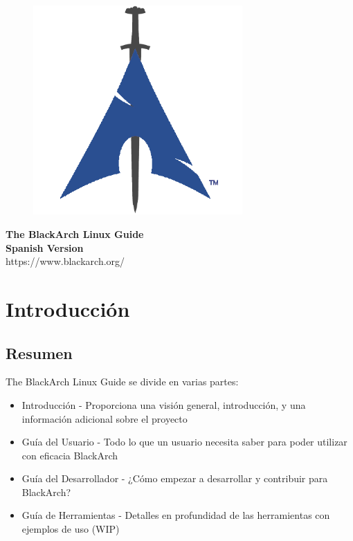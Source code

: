 \documentclass[a4paper, oneside, 11pt]{book}
\begin{document}
\pagestyle{empty}
\begin{center}
\begin{figure}[htbp]
\centering
\vspace{0.5cm}
\includegraphics[width=8cm]{images/logo.png}
\label{fig:logo}
\end{figure}
\vspace{0.5cm}
\Huge{\textbf{The BlackArch Linux Guide}}\\
\vspace{0.5cm}
\Large{\textbf{Spanish Version}}\\
\vspace{1cm}
\Large{\color{blue}https://www.blackarch.org/}\\
\vspace{0.5cm}
\end{center}
\newpage
\tableofcontents
\newpage
\pagestyle{fancy}


\chapter{Introducci\'on}

\section{Resumen}
The BlackArch Linux Guide se divide en varias partes:
\begin{itemize}
\item Introducci\'on - Proporciona una visi\'on general, introducci\'on, y una informaci\'on adicional sobre el proyecto
\item Gu\'ia del Usuario - Todo lo que un usuario necesita saber para poder utilizar con eficacia BlackArch
\item Gu\'ia del Desarrollador - ¿C\'omo empezar a desarrollar y contribuir para BlackArch?
\item Gu\'ia de Herramientas - Detalles en profundidad de las herramientas con ejemplos de uso (WIP)
\end{itemize}
\end{document}
